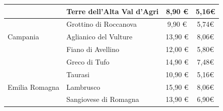 \documentclass[12pt, a4paper]{article}
\begin{document}
\begin{longtable}{@{}|l|l|c|c|}
                         & Terre dell'Alta Val d'Agri                                                & 8,90 €                                                          & 5,16€                                                                                                         \\ \hline
                         & Grottino di Roccanova                                                     & 9,90 €                                                          & 5,74€                                                                                                         \\ \hline
    Campania             & Aglianico del Vulture                                                     & 13,90 €                                                         & 8,06€                                                                                                         \\ \hline
                         & Fiano di Avellino                                                         & 12,00 €                                                         & 5,80€                                                                                                         \\ \hline
                         & Greco di Tufo                                                             & 14,90 €                                                         & 7,48€                                                                                                         \\ \hline
                         & Taurasi                                                                   & 10,90 €                                                          & 5,16€                                                                                                         \\ \hline
    Emilia Romagna       & Lambrusco                                                                 & 15,90 €                                                         & 8,06€                                                                                                         \\ \hline
                         & Sangiovese di Romagna                                                     & 13,90 €                                                         & 6,90€                                                                                                         \\ \hline

\end{longtable}
\end{document}

